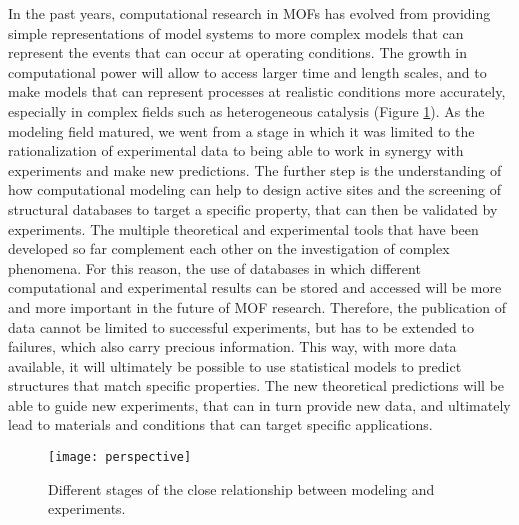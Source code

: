 \npar
In the past years, computational research in MOFs has evolved from providing simple representations of model systems to more complex models that can represent the events that can occur at operating conditions. The growth in computational power will allow to access larger time and length scales, and to make models that can represent processes at realistic conditions more accurately, especially in complex fields such as heterogeneous catalysis (Figure \ref{fig:perspective}). As the modeling field matured, we went from a stage in which it was limited to the rationalization of experimental data to being able to work in synergy with experiments and make new predictions. The further step is the understanding of how computational modeling can help to design active sites and the screening of structural databases to target a specific property, that can then be validated by experiments. The multiple theoretical and experimental tools that have been developed so far complement each other on the investigation of complex phenomena. For this reason, the use of databases in which different computational and experimental results can be stored and accessed will be more and more important in the future of MOF research. Therefore, the publication of data cannot be limited to successful experiments, but has to be extended to failures, which also carry precious information. This way, with more data available, it will ultimately be possible to use statistical models to predict structures that match specific properties. The new theoretical predictions will be able to guide new experiments, that can in turn provide new data, and ultimately lead to materials and conditions that can target specific applications.

\begin{figure}[!htbp]
	\centering
	\texttt{[image: perspective]}
	\caption{Different stages of the close relationship between modeling and experiments.}
	\label{fig:perspective}
\end{figure}